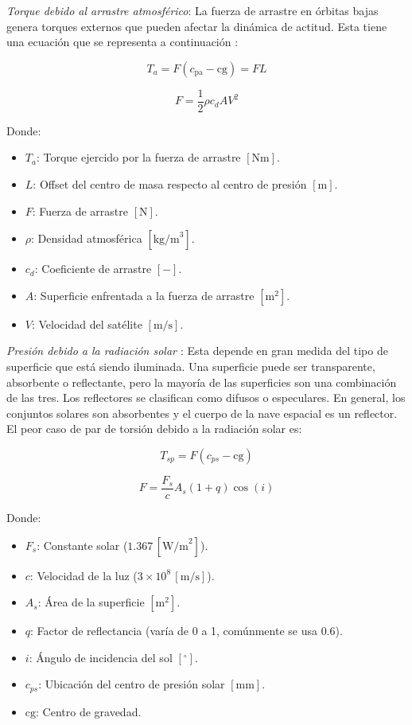\textit{Torque debido al arrastre atmosférico}: La fuerza de arrastre en órbitas bajas genera torques externos que pueden afectar la dinámica de actitud. Esta tiene una ecuación que se representa a continuación \cite{ref5}:

\[
T_a = F(c_{\text{pa}} - \text{cg}) = F L
\]

\[
F = \frac{1}{2} \rho c_d A V^2
\]

Donde:
\begin{itemize}
	\item $T_a$: Torque ejercido por la fuerza de arrastre $[\text{Nm}]$.
	\item $L$: Offset del centro de masa respecto al centro de presión $[\text{m}]$.
	\item $F$: Fuerza de arrastre $[\text{N}]$.
	\item $\rho$: Densidad atmosférica $[\text{kg/m}^3]$.
	\item $c_d$: Coeficiente de arrastre $[-]$.
	\item $A$: Superficie enfrentada a la fuerza de arrastre $[\text{m}^2]$.
	\item $V$: Velocidad del satélite $[\text{m/s}]$.
\end{itemize}


\textit{Presión debido a la radiación solar \cite{ref5}}: Esta depende en gran medida del tipo de superficie que está siendo iluminada. Una superficie puede ser transparente, absorbente o reflectante, pero la mayoría de las superficies son una combinación de las tres. Los reflectores se clasifican como difusos o especulares. En general, los conjuntos solares son absorbentes y el cuerpo de la nave espacial es un reflector. El peor caso de par de torsión debido a la radiación solar es:

\[
T_{sp} = F(c_{ps} - \text{cg})
\]

\[
F = \frac{F_s}{c} A_s (1 + q) \cos(i)
\]

Donde:
\begin{itemize}
	\item $F_s$: Constante solar ($1.367 \, [\text{W/m}^2]$).
	\item $c$: Velocidad de la luz ($3 \times 10^8 \, [\text{m/s}]$).
	\item $A_s$: Área de la superficie $[\text{m}^2]$.
	\item $q$: Factor de reflectancia (varía de 0 a 1, comúnmente se usa $0.6$).
	\item $i$: Ángulo de incidencia del sol $[^\circ]$.
	\item $c_{ps}$: Ubicación del centro de presión solar $[\text{mm}]$.
	\item $\text{cg}$: Centro de gravedad.
\end{itemize}

